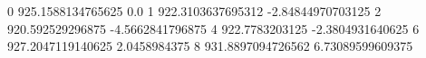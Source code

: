 0 925.1588134765625 0.0
1 922.3103637695312 -2.84844970703125
2 920.592529296875 -4.5662841796875
4 922.7783203125 -2.3804931640625
6 927.2047119140625 2.0458984375
8 931.8897094726562 6.73089599609375
